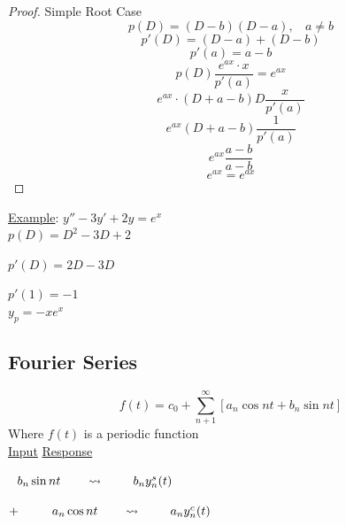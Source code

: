 \documentclass[12pt]{article}
\numberwithin{equation}{subsection}
\newcommand{\inda}{\hspace{.5cm}}
\newcommand{\indb}{\hspace{1cm}}
\newcommand{\indd}{\hspace{2cm}}
\newcommand{\exa}{\noindent \underline{Example}: \hspace{1cm}}
\begin{document}
\begin{proof} Simple Root Case
\begin{equation}
p(D)=(D-b)(D-a), \ \ \ \ a \neq b
\end{equation}
\begin{equation}
p'(D)=(D-a)+(D-b)
\end{equation}
\begin{equation}
p'(a)=a-b
\end{equation}
\begin{equation}
p(D)\frac{e^{ax}\cdot x}{p'(a)}=e^{ax}
\end{equation}
\begin{equation}
e^{ax} \cdot (D+a-b)D\frac{x}{p'(a)}
\end{equation}
\begin{equation}
e^{ax}(D+a-b)\frac{1}{p'(a)}
\end{equation}
\begin{equation}
e^{ax}\frac{a-b}{a-b}
\end{equation}
\begin{equation}
e^{ax}=e^{ax}
\end{equation}

\end{proof}

\exa $y''-3y'+2y=e^x$\\

\indd $p(D)=D^2-3D+2$

\indd $p'(D)=2D-3D$

\indd $p'(1)=-1$\\

\indb $y_p=-xe^x$


\newpage
\subsection{Fourier Series}

\begin{equation}
f(t)= c_0 + \sum_{n+1}^{\infty}[a_n \cos nt + b_n \sin nt] 
\end{equation}
Where $f(t)$ is a periodic function\\

\indb \underline{Input}  \hspace{2cm} \underline{Response}

\inda $ \hspace{.25cm }b_n \sin nt\ \ \ \ \ \ \leadsto \ \ \ \ \ \ \ b_ny_n^{s}(t)$

\noindent $+\ \ \ \ \ \ \hspace{.25cm }a_n \cos nt\ \ \ \ \ \ \leadsto \ \ \ \ \ \ \ a_ny_n^{c}(t)$
\end{document}
